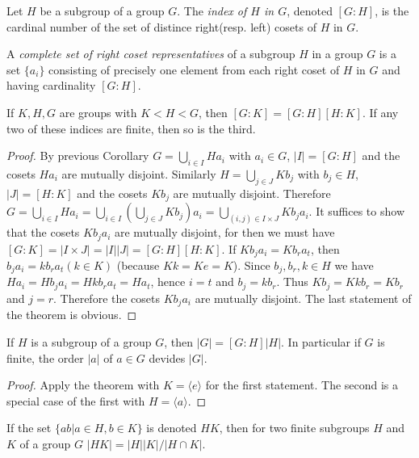 \begin{definition}
	Let $ H $ be a subgroup of a group $ G $. The \textit{index of $ H $ in $ G $}, denoted $ [G:H] $, is the cardinal number of the set of distince right(resp. left) cosets of $ H $ in $ G $.
\end{definition}
\begin{definition}
	A \textit{complete set of right coset representatives} of a subgroup $ H $ in a group $ G $ is a set $ \{a_i\} $ consisting of precisely one element from each right coset of $ H $ in $ G $ and having cardinality $ [G:H] $.
\end{definition}
\begin{theorem}
	If $ K,H,G $ are groups with $ K<H<G $, then $ [G:K]=[G:H][H:K] $. If any two of these indices are finite, then so is the third.
\end{theorem}
\begin{proof}
	By previous Corollary $ G = \bigcup_{i \in I}H a_i $ with $ a_i \in G $, $ |I| = [G:H] $ and the cosets $ Ha_i $ are mutually disjoint. Similarly $ H = \bigcup_{j \in J}Kb_j $ with $ b_j \in H $, $ |J| = [H:K] $ and the cosets $ Kb_j $ are mutually disjoint. Therefore $ G = \bigcup_{i \in I}Ha_i = \bigcup_{i \in I}(\bigcup_{j \in J}Kb_j)a_i =\bigcup_{(i,j)\in I \times J}Kb_j a_i$. It suffices to show that the cosets $ Kb_ja_i $ are mutually disjoint, for then we must have $ [G:K]=|I\times J| = |I||J| = [G:H][H:K] $. If $ Kb_ja_i=Kb_ra_t $, then $ b_j a_i = kb_r a_t(k \in K) $ (because $ Kk = Ke=K $). Since $ b_j,b_r,k \in H $ we have $ H a_i = H b_ja_i = H k b_r a_t = H a_t $, hence $ i=t $ and $ b_j = kb_r $. Thus $ K b_j = Kkb_r=Kb_r $ and $ j = r $. Therefore the cosets $ Kb_ja_i $ are mutually disjoint. The last statement of the theorem is obvious.
\end{proof}
\begin{Corollary}[Lagrange]
	If $ H $ is a subgroup of a group $ G $, then $ |G| = [G:H]|H| $. In particular if $ G $ is finite, the order $ |a| $ of $ a \in G $ devides $ |G| $.
\end{Corollary}
\begin{proof}
	Apply the theorem with $ K = \langle e\rangle $ for the first statement. The second is a special case of the first with $ H = \langle a\rangle $.
\end{proof}
\begin{theorem}
	If the set $ \{ab|a\in H,b \in K \} $ is denoted $ HK $, then for two finite subgroups $ H $ and $ K $ of a group $ G $ $ |HK|=|H||K|/|H \cap K| $.
\end{theorem}

